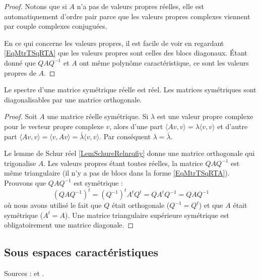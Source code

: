 \begin{proof}
    Notons que si \( A\) n'a pas de valeurs propres réelles, elle est automatiquement d'ordre pair parce que les valeurs propres complexes viennent par couple complexes conjuguées.

    En ce qui concerne les valeurs propres, il est facile de voir en regardant \eqref{EqMtrTSqRTA} que les valeurs propres sont celles des blocs diagonaux. Étant donné que \( QAQ^{-1}\) et \( A\) ont même polynôme caractéristique, ce sont les valeurs propres de \( A\).
\end{proof}

\begin{theorem}
    Le spectre d'une matrice symétrique réelle est réel. Les matrices symétriques sont diagonalisables par une matrice orthogonale.
\end{theorem}

\begin{proof}
    Soit \( A\) une matrice réelle symétrique. Si \( \lambda\) est une valeur propre complexe pour le vecteur propre complexe \( v\), alors d'une part \( \langle Av, v\rangle =\lambda\langle v, v\rangle \) et d'autre part \( \langle Av, v\rangle =\langle v, Av\rangle =\bar\lambda\langle v, v\rangle \). Par conséquent \( \lambda=\bar\lambda\).
    
    Le lemme de Schur réel \ref{LemSchureRelnrqfiy} donne une matrice orthogonale qui trigonalise \( A\). Les valeurs propres étant toutes réelles, la matrice \( QAQ^{-1}\) est même triangulaire (il n'y a pas de blocs dans la forme \eqref{EqMtrTSqRTA}). Prouvons que \( QAQ^{-1}\) est symétrique :
    \begin{equation}
        (QAQ^{-1})^t=(Q^{-1})^tA^tQ^t=QA^tQ^{-1}=QAQ^{-1}
    \end{equation}
    où nous avons utilisé le fait que \( Q\) était orthogonale (\( Q^{-1}=Q^t\)) et que \( A\) était symétrique (\( A^t=A\)). Une matrice triangulaire supérieure symétrique est obligatoirement une matrice diagonale.
\end{proof}

\subsection{Sous espaces caractéristiques}

Sources : \cite{MneimneReduct} et .

